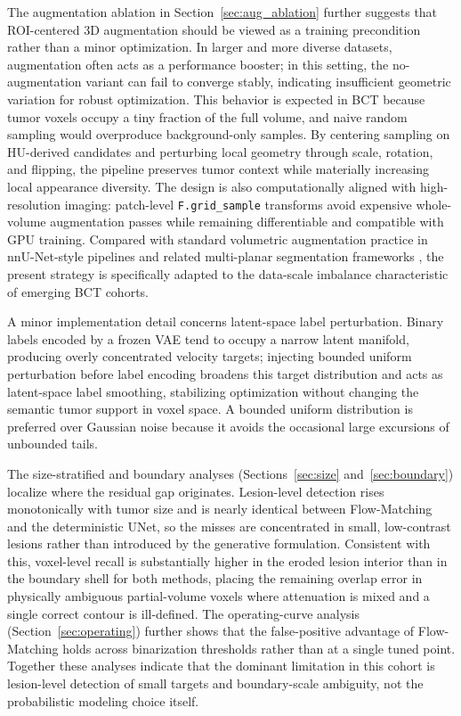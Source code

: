 \documentclass{iopjournal}
\begin{document}
The augmentation ablation in Section~\ref{sec:aug_ablation} further suggests that ROI-centered 3D augmentation should be viewed as a training precondition rather than a minor optimization. In larger and more diverse datasets, augmentation often acts as a performance booster; in this setting, the no-augmentation variant can fail to converge stably, indicating insufficient geometric variation for robust optimization. This behavior is expected in BCT because tumor voxels occupy a tiny fraction of the full volume, and naive random sampling would overproduce background-only samples. By centering sampling on HU-derived candidates and perturbing local geometry through scale, rotation, and flipping, the pipeline preserves tumor context while materially increasing local appearance diversity. The design is also computationally aligned with high-resolution imaging: patch-level \texttt{F.grid\_sample} transforms avoid expensive whole-volume augmentation passes while remaining differentiable and compatible with GPU training. Compared with standard volumetric augmentation practice in nnU-Net-style pipelines and related multi-planar segmentation frameworks \cite{isensee2021nnu, perez-garcia2021torchio, perslev2019onetoall}, the present strategy is specifically adapted to the data-scale imbalance characteristic of emerging BCT cohorts.

A minor implementation detail concerns latent-space label perturbation. Binary labels encoded by a frozen VAE tend to occupy a narrow latent manifold, producing overly concentrated velocity targets; injecting bounded uniform perturbation before label encoding broadens this target distribution and acts as latent-space label smoothing, stabilizing optimization without changing the semantic tumor support in voxel space. A bounded uniform distribution is preferred over Gaussian noise because it avoids the occasional large excursions of unbounded tails.

The size-stratified and boundary analyses (Sections~\ref{sec:size} and~\ref{sec:boundary}) localize where the residual gap originates. Lesion-level detection rises monotonically with tumor size and is nearly identical between Flow-Matching and the deterministic UNet, so the misses are concentrated in small, low-contrast lesions rather than introduced by the generative formulation. Consistent with this, voxel-level recall is substantially higher in the eroded lesion interior than in the boundary shell for both methods, placing the remaining overlap error in physically ambiguous partial-volume voxels where attenuation is mixed and a single correct contour is ill-defined. The operating-curve analysis (Section~\ref{sec:operating}) further shows that the false-positive advantage of Flow-Matching holds across binarization thresholds rather than at a single tuned point. Together these analyses indicate that the dominant limitation in this cohort is lesion-level detection of small targets and boundary-scale ambiguity, not the probabilistic modeling choice itself.
\end{document}
